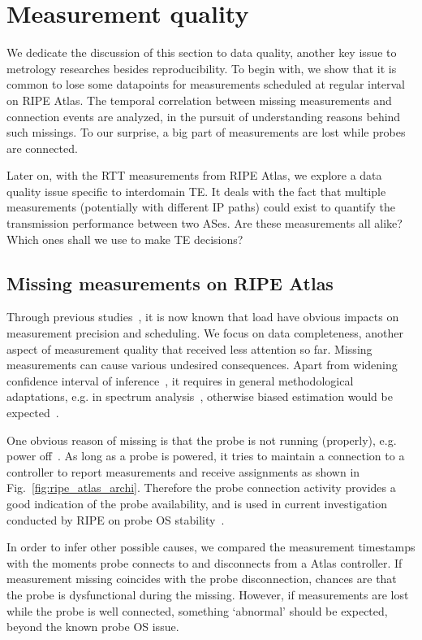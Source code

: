 \section{Measurement quality}
We dedicate the discussion of this section to data quality, another key issue to metrology researches besides reproducibility. To begin with, we show that it is common to lose some datapoints for measurements scheduled at regular interval on RIPE Atlas. The temporal correlation between missing measurements and connection events are 
analyzed, in the pursuit of understanding reasons behind such missings.
To our surprise, a big part of measurements are lost while probes are connected.

Later on, with the RTT measurements from RIPE Atlas, we explore a data quality issue specific to interdomain TE. It deals with the fact that multiple measurements (potentially with different IP paths) could exist to quantify the transmission performance between two ASes. Are these measurements all alike? Which ones shall we use to make TE decisions?

\subsection{Missing measurements on RIPE Atlas}
\label{sec:miss_atlas}
Through previous studies~\cite{Holterbach2015a, Bajpai2015}, it is now known that load have obvious impacts on measurement precision and scheduling.
We focus on data completeness, another aspect of measurement quality that received less attention so far. Missing measurements can cause various undesired consequences. Apart from widening confidence interval of inference~\cite{Fontugne2016}, it requires in general methodological adaptations, e.g. in spectrum analysis~\cite{Babu2010, Luckie2014, shao2016}, otherwise biased estimation would be expected~\cite{Baraldi2010}.

One obvious reason of missing is that the probe is not running (properly), e.g. power off~\cite{schedule}.
As long as a probe is powered, it tries to maintain a connection to a controller to report measurements and receive assignments as shown in Fig.~\ref{fig:ripe_atlas_archi}. 
Therefore the probe connection activity provides a good indication of the probe availability, and is used in current investigation conducted by RIPE on probe OS stability~\cite{1look, 2look, 3look}.

In order to infer other possible causes, we compared the measurement timestamps with the moments probe connects to and disconnects from a Atlas controller.
If measurement missing coincides with the probe disconnection, chances are that the probe is dysfunctional during the missing. However, if measurements are lost while the probe is well connected, something `abnormal' should be expected, beyond the known probe OS issue.

